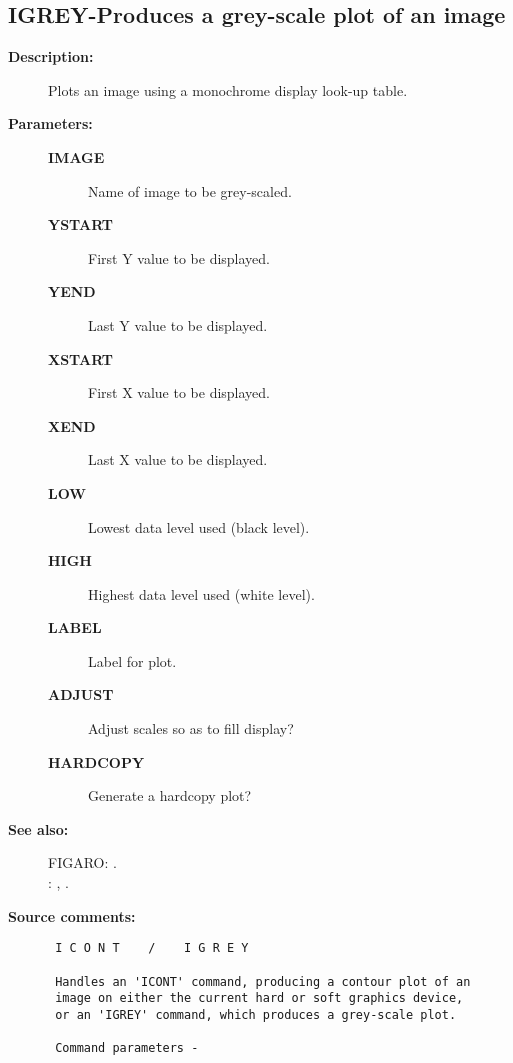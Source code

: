 \subsection{IGREY-\label{IGREY}Produces a grey-scale plot of an image}
\begin{description}

\item [{\bf Description:}]
 Plots an image using a monochrome display look-up table.

\item [{\bf Parameters:}]
\begin{description}
\item [{\bf IMAGE}]
 Name of image to be grey-scaled.
\item [{\bf YSTART}]
 First Y value to be displayed.
\item [{\bf YEND}]
 Last Y value to be displayed.
\item [{\bf XSTART}]
 First X value to be displayed.
\item [{\bf XEND}]
 Last X value to be displayed.
\item [{\bf LOW}]
 Lowest data level used (black level).
\item [{\bf HIGH}]
 Highest data level used (white level).
\item [{\bf LABEL}]
 Label for plot.
\item [{\bf ADJUST}]
 Adjust scales so as to fill display?
\item [{\bf HARDCOPY}]
 Generate a hardcopy plot?
\end{description}

\item [{\bf See also:}]
FIGARO: .\\
: , .\\

\item [{\bf Source comments:}]
\begin{verbatim}
 I C O N T    /    I G R E Y

 Handles an 'ICONT' command, producing a contour plot of an
 image on either the current hard or soft graphics device,
 or an 'IGREY' command, which produces a grey-scale plot.

 Command parameters -


\end{verbatim}
\end{description}
